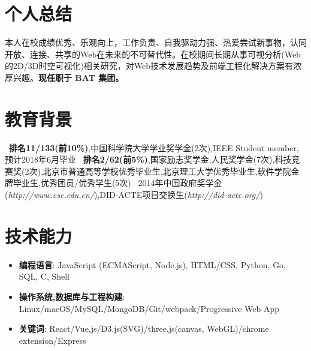 \documentclass{resume}
\begin{document}


 
\section{个人总结}
本人在校成绩优秀、乐观向上，工作负责、自我驱动力强、热爱尝试新事物，认同开放、连接、共享的Web在未来的不可替代性。在校期间长期从事可视分析(Web的2D/3D时空可视化)相关研究，对Web技术发展趋势及前端工程化解决方案有浓厚兴趣。\textbf{现任职于 BAT 集团。}

\section{教育背景}
\ \textbf{排名11/133(前10\%)},中国科学院大学学业奖学金(2次),IEEE Student member,预计2018年6月毕业
\ \textbf{排名2/62(前5\%)},国家励志奖学金,人民奖学金(7次),科技竞赛奖(2次),北京市普通高等学校优秀毕业生,北京理工大学优秀毕业生,软件学院金牌毕业生,优秀团员/优秀学生(5次)
\ 2014年中国政府奖学金(\textit{http://www.csc.edu.cn/}),DID-ACTE项目交换生(\textit{http://did-acte.org/})

\section{技术能力}
\begin{itemize}[parsep=0.2ex]
  \item \textbf{编程语言}: JavaScript (ECMAScript, Node.js), HTML/CSS, Python, Go, SQL, C, Shell
  \item \textbf{操作系统,数据库与工程构建}: Linux/macOS/MySQL/MongoDB/Git/webpack/Progressive Web App
  \item \textbf{关键词}: React/Vue.js/D3.js(SVG)/three.js(canvas, WebGL)/chrome extension/Express
\end{itemize}
\end{document}
